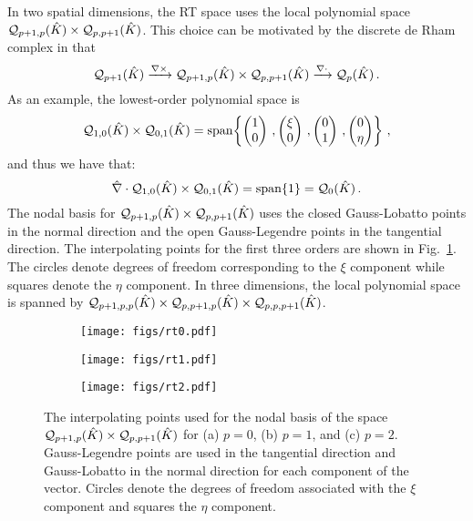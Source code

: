 \documentclass[../doc.tex]{subfiles}
\begin{document}
In two spatial dimensions, the RT space uses the local polynomial space $\mathcal{Q}_{p+1,p}(\hat{K}) \times \mathcal{Q}_{p,p+1}(\hat{K})$. This choice can be motivated by the discrete de Rham complex \cite{mfem_brezzi} in that 
	\begin{equation}
		\mathcal{Q}_{p+1}(\hat{K}) \xrightarrow{\nabla\times} \mathcal{Q}_{p+1,p}(\hat{K})\times \mathcal{Q}_{p,p+1}(\hat{K}) \xrightarrow{\nabla\cdot} \mathcal{Q}_{p}(\hat{K}) \,. 
	\end{equation}
As an example, the lowest-order polynomial space is
	\begin{equation}
		\mathcal{Q}_{1,0}(\hat{K}) \times \mathcal{Q}_{0,1}(\hat{K}) = \operatorname{span}\!\left\{ \begin{pmatrix} 1 \\ 0 \end{pmatrix}\,, \begin{pmatrix} \xi \\ 0 \end{pmatrix} \,, \begin{pmatrix} 0 \\ 1 \end{pmatrix} \,, \begin{pmatrix} 0 \\ \eta \end{pmatrix} \right\} \,, 
	\end{equation}
and thus we have that: 
	\begin{equation}
		\hat{\nabla}\cdot \mathcal{Q}_{1,0}(\hat{K}) \times \mathcal{Q}_{0,1}(\hat{K}) = \operatorname{span}\!\left\{ 1 \right\} = \mathcal{Q}_{0}(\hat{K}) \,. 
	\end{equation}
The nodal basis for $\mathcal{Q}_{p+1,p}(\hat{K}) \times \mathcal{Q}_{p,p+1}(\hat{K})$ uses the closed Gauss-Lobatto points in the normal direction and the open Gauss-Legendre points in the tangential direction. The interpolating points for the first three orders are shown in Fig.~\ref{fem:rt_local_poly}. The circles denote degrees of freedom corresponding to the $\xi$ component while squares denote the $\eta$ component. In three dimensions, the local polynomial space is spanned by $\mathcal{Q}_{p+1,p,p}(\hat{K}) \times \mathcal{Q}_{p,p+1,p}(\hat{K}) \times \mathcal{Q}_{p,p,p+1}(\hat{K})$.%
\begin{figure}
\centering
\begin{subfigure}{.25\textwidth}
	\centering
	\texttt{[image: figs/rt0.pdf]}
	\caption{}
\end{subfigure}\qquad
\begin{subfigure}{.25\textwidth}
	\centering
	\texttt{[image: figs/rt1.pdf]}
	\caption{}
\end{subfigure}\qquad
\begin{subfigure}{.25\textwidth}
	\centering
	\texttt{[image: figs/rt2.pdf]}
	\caption{}
\end{subfigure}
\caption{The interpolating points used for the nodal basis of the space $\mathcal{Q}_{p+1,p}(\hat{K})\times \mathcal{Q}_{p,p+1}(\hat{K})$ for (a) $p=0$, (b) $p=1$, and (c) $p=2$. Gauss-Legendre points are used in the tangential direction and Gauss-Lobatto in the normal direction for each component of the vector. Circles denote the degrees of freedom associated with the $\xi$ component and squares the $\eta$ component. }
\label{fem:rt_local_poly}
\end{figure}
\end{document}

